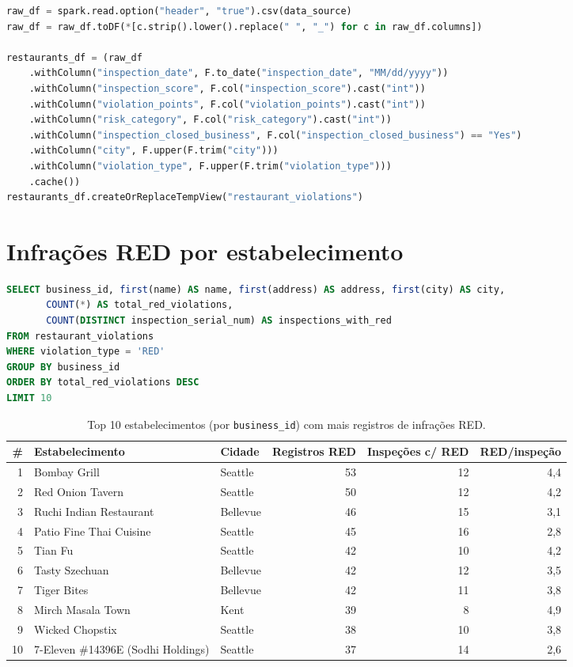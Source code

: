 \documentclass[11pt,a4paper]{article}
\newcommand{\col}[1]{\texttt{#1}}
\begin{document}
\begin{lstlisting}[language=Python]
raw_df = spark.read.option("header", "true").csv(data_source)
raw_df = raw_df.toDF(*[c.strip().lower().replace(" ", "_") for c in raw_df.columns])

restaurants_df = (raw_df
    .withColumn("inspection_date", F.to_date("inspection_date", "MM/dd/yyyy"))
    .withColumn("inspection_score", F.col("inspection_score").cast("int"))
    .withColumn("violation_points", F.col("violation_points").cast("int"))
    .withColumn("risk_category", F.col("risk_category").cast("int"))
    .withColumn("inspection_closed_business", F.col("inspection_closed_business") == "Yes")
    .withColumn("city", F.upper(F.trim("city")))
    .withColumn("violation_type", F.upper(F.trim("violation_type")))
    .cache())
restaurants_df.createOrReplaceTempView("restaurant_violations")
\end{lstlisting}

\section{Infrações RED por estabelecimento}

\begin{lstlisting}[language=SQL]
SELECT business_id, first(name) AS name, first(address) AS address, first(city) AS city,
       COUNT(*) AS total_red_violations,
       COUNT(DISTINCT inspection_serial_num) AS inspections_with_red
FROM restaurant_violations
WHERE violation_type = 'RED'
GROUP BY business_id
ORDER BY total_red_violations DESC
LIMIT 10
\end{lstlisting}

\begin{table}[H]
\centering
\small
\caption{Top 10 estabelecimentos (por \col{business\_id}) com mais registros de infrações RED.}
\begin{tabular}{rllrrr}
\toprule
\# & Estabelecimento & Cidade & Registros RED & Inspeções c/ RED & RED/inspeção \\
\midrule
1 & Bombay Grill & Seattle & 53 & 12 & 4,4 \\
2 & Red Onion Tavern & Seattle & 50 & 12 & 4,2 \\
3 & Ruchi Indian Restaurant & Bellevue & 46 & 15 & 3,1 \\
4 & Patio Fine Thai Cuisine & Seattle & 45 & 16 & 2,8 \\
5 & Tian Fu & Seattle & 42 & 10 & 4,2 \\
6 & Tasty Szechuan & Bellevue & 42 & 12 & 3,5 \\
7 & Tiger Bites & Bellevue & 42 & 11 & 3,8 \\
8 & Mirch Masala Town & Kent & 39 & 8 & 4,9 \\
9 & Wicked Chopstix & Seattle & 38 & 10 & 3,8 \\
10 & 7-Eleven \#14396E (Sodhi Holdings) & Seattle & 37 & 14 & 2,6 \\
\bottomrule
\end{tabular}
\end{table}
\end{document}
